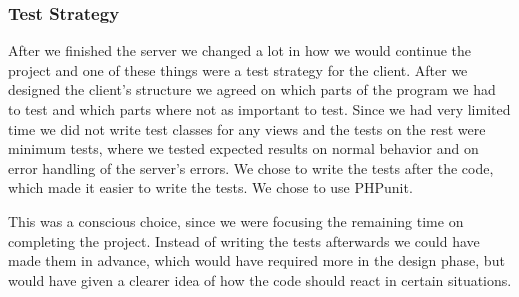 \subsubsection{Test Strategy}
After we finished the server we changed a lot in how we would continue the project and one of these things were a test strategy for the client. After we designed the client's structure we agreed on which parts of the program we had to test and which parts where not as important to test. Since we had very limited time we did not write test classes for any views and the tests on the rest were minimum tests, where we tested expected results on normal behavior and on error handling of the server's errors. We chose to write the tests after the code, which made it easier to write the tests. We chose to use PHPunit.

This was a conscious choice, since we were focusing the remaining time on completing the project. Instead of writing the tests afterwards we could have made them in advance, which would have required more in the design phase, but would have given a clearer idea of how the code should react in certain situations.